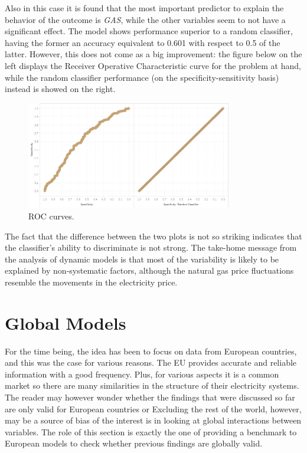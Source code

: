 \documentclass{book}
\begin{document}
Also in this case it is found that the most important predictor to explain the behavior of the outcome is \textit{GAS}, while the other variables seem to not have a significant effect. The model shows performance superior to a random classifier, having the former an accuracy equivalent to 0.601 with respect to 0.5 of the latter. However, this does not come as a big improvement: the figure below on the left displays the Receiver Operative Characteristic curve for the problem at hand, while the random classifier performance (on the specificity-sensitivity basis) instead is showed on the right.

\bigskip
\begin{figure}[H]
\begin{center}
\captionsetup{justification=centering}
\includegraphics[width=0.8\textwidth]{Images/ROc.png}
\caption{ROC curves.}
\end{center}
\end{figure}
\bigskip

The fact that the difference between the two plots is not so striking indicates that the classifier's ability to discriminate is not strong. The take-home message from the analysis of dynamic models is that most of the variability is likely to be explained by non-systematic factors, although the natural gas price fluctuations resemble the movements in the electricity price.

\section{Global Models}

For the time being, the idea has been to focus on data from European countries, and this was the case for various reasons. The EU provides accurate and reliable information with a good frequency. Plus, for various aspects it is a common market so there are many similarities in the structure of their electricity systems. The reader may however wonder whether the findings that were discussed so far are only valid for European countries or  Excluding the rest of the world, however, may be a source of bias of the interest is in looking at global interactions between variables. The role of this section is exactly the one of providing a benchmark to European models to check whether previous findings are globally valid.
\end{document}
